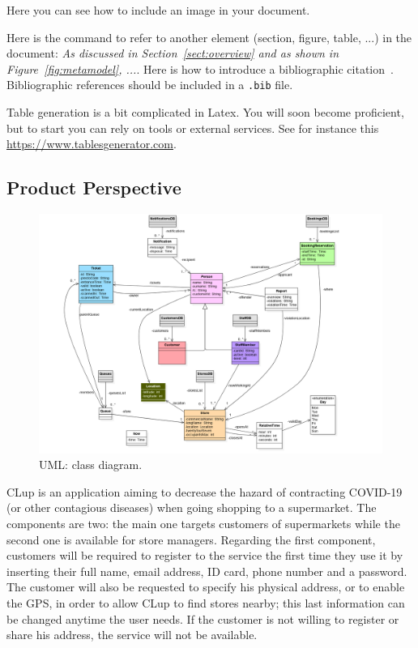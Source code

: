 \sffamily
Here you can see how to include an image in your document.

Here is the command to refer to another element (section, figure, table, ...) in the document: \emph{As discussed in Section~\ref{sect:overview} and as shown in Figure~\ref{fig:metamodel}, ...}. Here is how to introduce a bibliographic citation~\cite{DAM}. Bibliographic references should be included in a \texttt{.bib} file. 

Table generation is a bit complicated in Latex. You will soon become proficient, but to start you can rely on tools or external services. See for instance this \href{https://www.tablesgenerator.com}{https://www.tablesgenerator.com}. \\

\subsection{Product Perspective}
\begin{figure}
	\includegraphics[width=\linewidth]{../Diagrams/main_class_diagram.png}
	\caption{UML: class diagram.}
	\label{fig:UML}
\end{figure}
CLup is an application aiming to decrease the hazard of contracting COVID-19 (or other contagious diseases) when going shopping to a supermarket. The components are two: the main one targets customers of supermarkets while the second one is available for store managers.\newline
Regarding the first component, customers will be required to register to the service the first time they use it by inserting their full name, email address, ID card, phone number and a password. The customer will also be requested to specify his physical address, or to enable the GPS, in order to allow CLup to find stores nearby; this last information can be changed anytime the user needs. If the customer is not willing to register or share his address, the service will not be available.\newline
